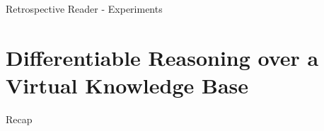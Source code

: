\documentclass[10pt]{beamer}
\begin{document}
\begin{frame}{Retrospective Reader - Experiments}

    \begin{figure}
        \begin{center}
        \end{center}
    \end{figure}

\end{frame}


\section{Differentiable Reasoning over a Virtual Knowledge Base}

\begin{frame}{Recap}
    \begin{figure}
        \begin{center}
        \end{center}
    \end{figure}
\end{frame}
\end{document}

